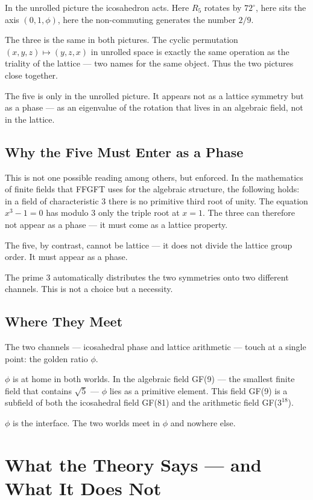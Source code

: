 \documentclass[12pt,oneside]{book}
\begin{document}
In the unrolled picture the icosa\-hedron acts. Here $R_5$ rotates by $72^\circ$, here sits the axis $(0, 1, \phi)$, here the non-commuting generates the number $2/9$.

The three is the same in both pictures. The cyclic permutation $(x, y, z) \mapsto (y, z, x)$ in unrolled space is exactly the same operation as the triality of the lattice --- two names for the same object. Thus the two pictures close together.

The five is only in the unrolled picture. It appears not as a lattice symmetry but as a phase --- as an eigenvalue of the rotation that lives in an algebraic field, not in the lattice.

\section{Why the Five Must Enter as a Phase}

This is not one possible reading among others, but enforced. In the mathematics of finite fields that FFGFT uses for the algebraic structure, the following holds: in a field of characteristic 3 there is no primitive third root of unity. The equation $x^3 - 1 = 0$ has modulo 3 only the triple root at $x = 1$. The three can therefore not appear as a phase --- it must come as a lattice property.

The five, by contrast, cannot be lattice --- it does not divide the lattice group order. It must appear as a phase.

The prime 3 automatically distributes the two symmetries onto two different channels. This is not a choice but a necessity.

\section{Where They Meet}

The two channels --- icosahedral phase and lattice arithmetic --- touch at a single point: the golden ratio $\phi$.

$\phi$ is at home in both worlds. In the algebraic field GF(9) --- the smallest finite field that contains $\sqrt{5}$ --- $\phi$ lies as a primitive element. This field GF(9) is a subfield of both the icosahedral field GF(81) and the arithmetic field GF($3^{18}$).

$\phi$ is the interface. The two worlds meet in $\phi$ and nowhere else.

\chapter{What the Theory Says --- and What It Does Not}
\end{document}
